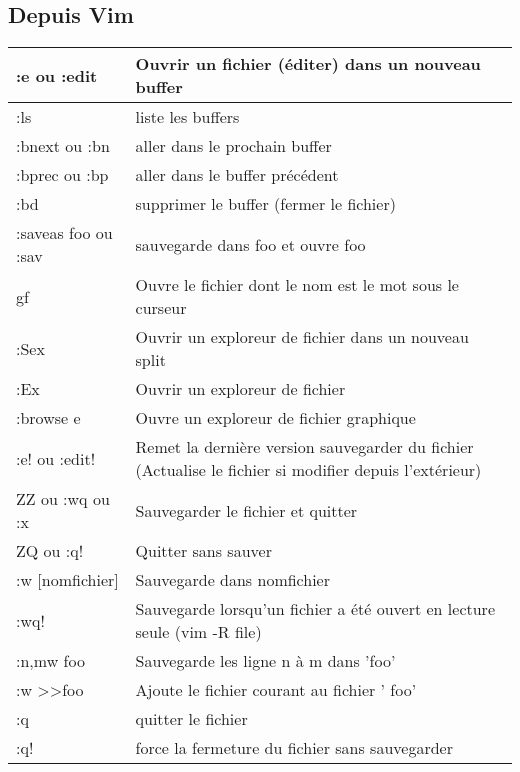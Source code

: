 \documentclass{article}
\begin{document}
                    \subsection{Depuis Vim}
                    \begin{tabular}{|p{3cm}| l| }
                        \hline
                        :e ou :edit & Ouvrir un fichier (éditer) dans un nouveau buffer \\ \hline
                        :ls & liste les buffers  \\ \hline
                        :bnext ou :bn & aller dans le prochain buffer  \\ \hline
                        :bprec ou :bp & aller dans le buffer précédent  \\ \hline
                        :bd & supprimer le buffer (fermer le fichier)  \\ \hline
                        :saveas foo ou :sav &  sauvegarde dans foo et ouvre foo\\ \hline
                        gf & Ouvre le fichier dont le nom est le mot sous le curseur\\ \hline
                        :Sex & Ouvrir un exploreur de fichier dans un nouveau split\\ \hline
                        :Ex & Ouvrir un exploreur de fichier\\ \hline
                        :browse e & Ouvre un exploreur de fichier graphique \\ \hline
                        :e! ou :edit! & Remet la dernière version sauvegarder du fichier  (Actualise le fichier si modifier depuis l'extérieur)\\ \hline
                        ZZ ou :wq ou :x & Sauvegarder le fichier et quitter\\ \hline
                        ZQ ou :q! & Quitter sans sauver\\ \hline
                        :w [nomfichier]& Sauvegarde dans nomfichier \\ \hline
                        :wq! & Sauvegarde lorsqu'un fichier a été ouvert en lecture seule (vim -R file) \\ \hline
                        :n,mw foo & Sauvegarde les ligne n à m dans 'foo' \\ \hline
                        :w \textgreater \textgreater foo & Ajoute le fichier courant au fichier ' foo'\\ \hline
                        :q & quitter le fichier \\ \hline
                        :q! & force la fermeture du fichier sans sauvegarder \\ \hline
                    \end{tabular}\\
\end{document}
